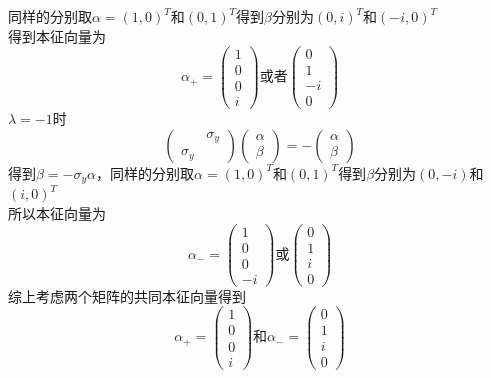 \documentclass{article}
\numberwithin{equation}{subsection}
\begin{document}
同样的分别取$\alpha=(1,0)^T$和$(0,1)^T$得到$\beta$分别为$(0,i)^T$和$(-i,0)^T$\\
得到本征向量为
\begin{equation}
    \alpha_+=\begin{pmatrix}
        1\\0\\0\\i
    \end{pmatrix}\text{或者}\begin{pmatrix}
        0\\1\\-i\\0
    \end{pmatrix}
\end{equation}
$\lambda=-1$时
\begin{equation}
    \begin{pmatrix}
        \quad&\sigma_y\\\sigma_y&\quad
    \end{pmatrix}\begin{pmatrix}
    \alpha\\\beta
    \end{pmatrix}=-\begin{pmatrix}
        \alpha\\\beta
    \end{pmatrix}
\end{equation}
得到$\beta=-\sigma_y\alpha$，同样的分别取$\alpha=(1,0)^T$和$(0,1)^T$得到$\beta$分别为$(0,-i)$和$(i,0)^T$\\
所以本征向量为
\begin{equation}
    \alpha_-=\begin{pmatrix}
        1\\0\\0\\-i
    \end{pmatrix}\text{或}\begin{pmatrix}
        0\\1\\i\\0
    \end{pmatrix}
\end{equation}
综上考虑两个矩阵的共同本征向量得到
\begin{equation}
    \alpha_+=\begin{pmatrix}
        1\\0\\0\\i
    \end{pmatrix}\text{和}\alpha_-=\begin{pmatrix}
        0\\1\\i\\0
    \end{pmatrix}
\end{equation}
\end{document}
